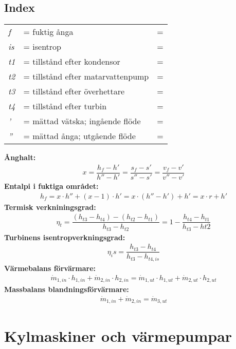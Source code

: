 \subsection*{Index}
	\begin{tabularx}{\linewidth} { l
	>{\raggedright\arraybackslash\hsize=1.5\hsize\linewidth=\hsize}X
	>{\raggedright\arraybackslash\hsize=0.5\hsize\linewidth=\hsize}X}
	\textit{f} & fuktig ånga\\ 
	\textit{is} & isentrop\\ 
	\textit{t1} & tillstånd efter kondensor\\ 
	\textit{t2} & tillstånd efter matarvattenpump\\ 
	\textit{t3} & tillstånd efter överhettare\\ 
	\textit{t4} & tillstånd efter turbin\\ 
	\textit{'} & mättad vätska; ingående flöde\\ 
	\textit{''} & mättad ånga; utgående flöde\\ 
	\end{tabularx}
	\textbf{Ånghalt:}
	\begin{align*}
		x = \dfrac{h_f-h'}{h''-h'} = \dfrac{s_f-s'}{s''-s'} = \dfrac{v_f-v'}{v''-v'}
	\end{align*}
	\textbf{Entalpi i fuktiga området:}
	\begin{align*}
		h_f = x \cdot h'' + (x  - 1)  \cdot h' = x \cdot (h'' - h') + h' = x \cdot r + h' 
	\end{align*}
	\textbf{Termisk verkniningsgrad:}
	\begin{align*}
		\eta_t=\dfrac{(h_{t3}-h_{t4})-(h_{t2}-h_{t1})}{h_{t3}-h_{t2}}=1-\dfrac{h_{t4}-h_{t1}}{h_{t3}-h{t2}}
	\end{align*}
	\textbf{Turbinens isentropverkningsgrad:}
	\begin{align*}
		\eta_is=\dfrac{h_{t3}-h_{t4}}{h_{t3}-h_{t4,is}}
	\end{align*}
	\textbf{Värmebalans förvärmare:}
	\begin{align*}
		\dot{m}_{1,in}\cdot h_{1,in}+\dot{m}_{2,in}\cdot h_{2,in} = \dot{m}_{1,ut}\cdot h_{1,ut}+\dot{m}_{2,ut}\cdot h_{2,ut}
	\end{align*}
	\textbf{Massbalans blandningsförvärmare:}
	\begin{align*}
		\dot{m}_{1,in}+\dot{m}_{2,in} = \dot{m}_{3,ut}
	\end{align*}
\section*{Kylmaskiner och värmepumpar}
